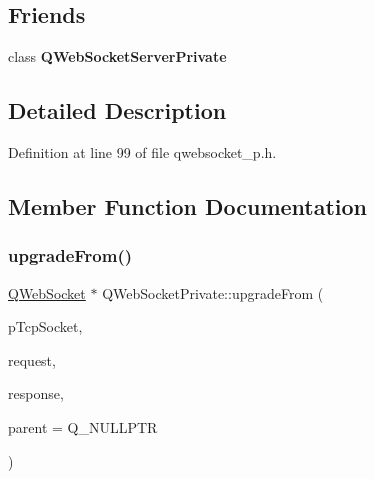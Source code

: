 \subsection*{Friends}
\begin{DoxyCompactItemize}
\item 
\mbox{\label{class_q_web_socket_private_a5858fd2060c3d5ff3a1f72ff3be4167e}} 
class {\bfseries Q\+Web\+Socket\+Server\+Private}
\end{DoxyCompactItemize}


\subsection{Detailed Description}


Definition at line 99 of file qwebsocket\+\_\+p.\+h.



\subsection{Member Function Documentation}
\mbox{\label{class_q_web_socket_private_a5c867be71bd2e6a66136cab1d954e611}} 
\subsubsection{\texorpdfstring{upgrade\+From()}{upgradeFrom()}}
{\footnotesize\ttfamily \mbox{\hyperlink{class_q_web_socket}{Q\+Web\+Socket}} $\ast$ Q\+Web\+Socket\+Private\+::upgrade\+From (\begin{DoxyParamCaption}\item[{Q\+Tcp\+Socket $\ast$}]{p\+Tcp\+Socket,  }\item[{const \mbox{\hyperlink{class_q_web_socket_handshake_request}{Q\+Web\+Socket\+Handshake\+Request}} \&}]{request,  }\item[{const \mbox{\hyperlink{class_q_web_socket_handshake_response}{Q\+Web\+Socket\+Handshake\+Response}} \&}]{response,  }\item[{Q\+Object $\ast$}]{parent = {\ttfamily Q\+\_\+NULLPTR} }\end{DoxyParamCaption})\hspace{0.3cm}{\ttfamily [static]}}

